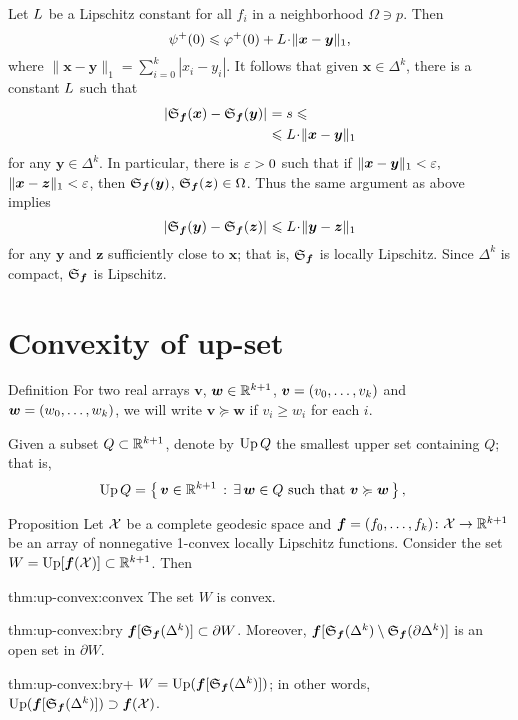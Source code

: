 Let $L$ be a Lipschitz constant for all $f_i$ in a neighborhood $\Omega\ni p$.
Then 
\[\psi^+(0)
\le 
\phi^+(0)+\Lip\cdot\|\bm{x}-\bm{y}\|_1,\] 
where $\|\bm{x}-\bm{y}\|_1=\sum_{i=0}^k|x_i-y_i|$.
It follows that given $\bm{x}\in\Delta^k$, there is a constant $L$ such that
\begin{align*}
\dist{\spx{\bm{f}}(\bm{x})}{\spx{\bm{f}}(\bm{y})}{}
&=
s
\le
\\
&\le 
\Lip\cdot\|\bm{x}-\bm{y}\|_1
\end{align*}
for any $\bm{y}\in\Delta^k$.
In particular, there is $\varepsilon>0$ such that if $\|\bm{x}-\bm{y}\|_1<\varepsilon,$ $\|\bm{x}-\bm{z}\|_1 <\varepsilon$, then $\mathfrak{S}_{\bm{f}}(\bm{y})$, $\mathfrak{S}_{\bm{f}}(\bm{z})\in\Omega$. 
Thus the same argument as above implies 
\[\dist{\spx{\bm{f}}(\bm{y})}{\spx{\bm{f}}(\bm{z})}{}
\le \Lip\cdot\|\bm{y}-\bm{z}\|_1\]
for any $\bm{y}$ and $\bm{z}$ sufficiently close to $\bm{x}$; that is, $\mathfrak{S}_{\bm{f}}$ is locally Lipschitz.
Since $\Delta^k$ is compact, $\mathfrak{S}_{\bm{f}}$ is Lipschitz.
\qeds



\section{Convexity of up-set}

\begin{thm}{Definition}\label{def:ordung}
For two real arrays $\bm{v}$, $\bm{w}\in \mathbb{R}^{k+1}$,
$\bm{v}=(v_0,\z\dots,v_\kay)$ 
and 
$\bm{w}=(w_0,\z\dots,w_\kay)$, 
we will write
$\bm{v}\succcurlyeq\bm{w}$ if $v_i\ge w_i$ for each $i$.
\end{thm}

Given a subset $Q\subset \mathbb{R}^{k+1}$, 
denote by $\mathop{\rm Up}\nolimits Q$ \label{PAGE.def:Up}
the smallest upper set containing $Q$;
that is,
\begin{align*}
\Up Q 
&=
\set{\bm{v}\in\RR^{\kay+1}}{\exists\, \bm{w}\in Q\ \text{such that}\ \bm{v}\succcurlyeq\bm{w}},
\end{align*}

\begin{thm}{Proposition}\label{thm:up-convex}
Let $\mathcal{X}$ be a complete geodesic space 
and $\bm{f}\z=(f_0,\z\dots,f_\kay)\:\spc{X}\to\RR^{\kay+1}$ 
be an array of nonnegative 1-convex locally Lipschitz functions.
Consider the set $W=\mathop{\rm Up}\nolimits[\bm{f}(\mathcal{X})]\subset\mathbb{R}^{k+1}$.
Then 
\begin{subthm}{thm:up-convex:convex}
The set $W$ is convex.
\end{subthm}

\begin{subthm}{thm:up-convex:bry}
$\bm{f}[\mathfrak{S}_{\bm{f}}(\Delta^k)]\subset\partial W$.
Moreover, $\bm{f}[\mathfrak{S}_{\bm{f}}(\Delta^k)\setminus \mathfrak{S}_{\bm{f}}(\partial\Delta^k)]$ is an open set in $\partial W$.
\end{subthm}

\begin{subthm}{thm:up-convex:bry+}
$W=\mathop{\rm Up}\nolimits(\bm{f}[\mathfrak{S}_{\bm{f}}(\Delta^k)])$; 
in other words, $\mathop{\rm Up}\nolimits(\bm{f}[\mathfrak{S}_{\bm{f}}(\Delta^k)])\supset\bm{f}(\mathcal{X})$.
\end{subthm}




\end{thm}

